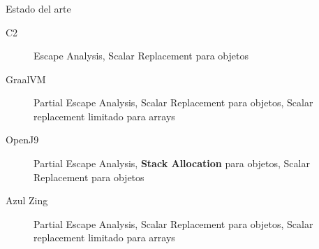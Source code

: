 \begin{frame}[fragile]
  \frametitle{\ft}
  \begin{block}{Estado del arte}
    \begin{description}
    \item[C2]
      Escape Analysis,
      Scalar Replacement para objetos
    \item[GraalVM]
      Partial Escape Analysis,
      Scalar Replacement para objetos,
      Scalar replacement limitado para arrays
    \item[OpenJ9]
      Partial Escape Analysis,
      {\bf Stack Allocation} para objetos,
      Scalar Replacement para objetos
    \item[Azul Zing]
      Partial Escape Analysis,
      Scalar Replacement para objetos,
      Scalar replacement limitado para arrays
    \end{description}
  \end{block}
\end{frame}
